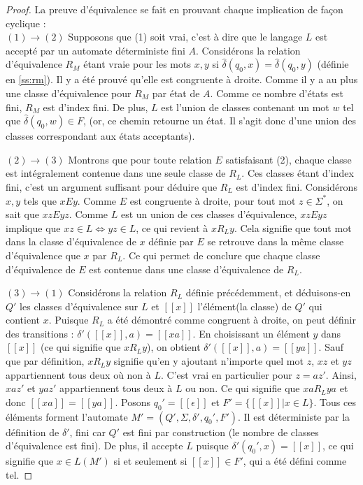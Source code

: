 	\begin{proof}La preuve d'équivalence se fait en prouvant chaque implication de façon cyclique :\\
		
		$(1)\rightarrow(2)$ Supposons que (1) soit vrai, c'est à dire que le langage $L$ est accepté par un automate déterministe fini $A$. Considérons la relation d'équivalence $R_M$ étant vraie pour les mots $x,y$ si $\hat{\delta}(q_0,x)=\hat{\delta}(q_0,y)$ (définie en \ref{ss:rm}). Il y a été prouvé qu'elle est congruente à droite. Comme il y a au plus une classe d'équivalence pour $R_M$ par état de $A$. Comme ce nombre d'états est fini, $R_M$ est d'index fini. De plus, $L$ est l'union de classes contenant un mot $w$ tel que $\hat{\delta}(q_0,w) \in F$, (or, ce chemin retourne un état. Il s'agit donc d'une union des classes correspondant aux états acceptants).
		
		$(2)\rightarrow(3)$ Montrons que pour toute relation $E$ satisfaisant (2), chaque classe est intégralement contenue dans une seule classe de $R_L$. Ces classes étant d'index fini, c'est un argument suffisant pour déduire que $R_L$ est d'index fini. Considérons $x,y$ tels que $xEy$. Comme $E$ est congruente à droite, pour tout mot $z \in \Sigma^*$, on sait que $xzEyz$. Comme $L$ est un union de ces classes d'équivalence, $xzEyz$ implique que $xz \in L \Leftrightarrow yz \in L$, ce qui revient à $xR_Ly$. Cela signifie que tout mot dans la classe d'équivalence de $x$ définie par $E$ se retrouve dans la même classe d'équivalence que $x$ par $R_L$. Ce qui permet de conclure que chaque classe d'équivalence de $E$ est contenue dans une classe d'équivalence de $R_L$. 
	
		
		$(3)\rightarrow(1)$ Considérons la relation $R_L$ définie précédemment, et déduisons-en $Q'$ les classes d'équivalence sur $L$ et $[[x]]$ l'élément(la classe) de $Q'$ qui contient $x$. Puisque $R_L$ a été démontré comme congruent à droite, on peut définir des transitions : $\delta'([[x]],a) = [[xa]]$. En choisissant un élément $y$ dans $[[x]]$ (ce qui signifie que $xR_Ly$), on obtient $\delta'([[x]],a)=[[ya]]$. Sauf que par définition, $xR_Ly$ signifie qu'en y ajoutant n'importe quel mot $z$, $xz$ et $yz$ appartiennent tous deux où non à $L$. C'est vrai en particulier pour $z=az'$. Ainsi, $xaz'$ et $yaz'$ appartiennent tous deux à $L$ ou non. Ce qui signifie que $xaR_Lya$ et donc $[[xa]]=[[ya]]$. Posons $q_0'=[[\epsilon]]$ et $F' = \{[[x]]|x \in L\}$. Tous ces éléments forment l'automate $M'=(Q', \Sigma, \delta', q_0', F')$. Il est déterministe par la définition de $\delta'$, fini car $Q'$ est fini par construction (le nombre de classes d'équivalence est fini). De plus, il accepte $L$ puisque $\delta'(q_0',x)=[[x]]$, ce qui signifie que $x \in L(M')$ si et seulement si $[[x]] \in F'$, qui a été défini comme tel.
		
		
	\end{proof}


